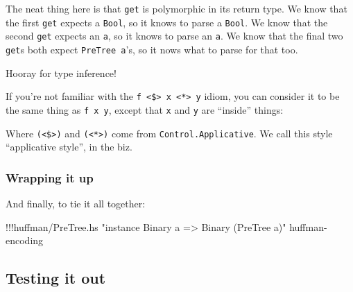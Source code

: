 \documentclass[]{article}
\newenvironment{Shaded}{}{}
\newcommand{\DataTypeTok}[1]{\textcolor[rgb]{0.56,0.13,0.00}{{#1}}}
\newcommand{\DecValTok}[1]{\textcolor[rgb]{0.25,0.63,0.44}{{#1}}}
\newcommand{\StringTok}[1]{\textcolor[rgb]{0.25,0.44,0.63}{{#1}}}
\newcommand{\FunctionTok}[1]{\textcolor[rgb]{0.02,0.16,0.49}{{#1}}}
\newcommand{\NormalTok}[1]{{#1}}
\begin{document}
The neat thing here is that \texttt{get} is polymorphic in its return
type. We know that the first \texttt{get} expects a \texttt{Bool}, so it
knows to parse a \texttt{Bool}. We know that the second \texttt{get}
expects an \texttt{a}, so it knows to parse an \texttt{a}. We know that
the final two \texttt{get}s both expect \texttt{PreTree\ a}'s, so it
nows what to parse for that too.

Hooray for type inference!

If you're not familiar with the
\texttt{f\ \textless{}\$\textgreater{}\ x\ \textless{}*\textgreater{}\ y}
idiom, you can consider it to be the same thing as \texttt{f\ x\ y},
except that \texttt{x} and \texttt{y} are ``inside'' things:

\begin{Shaded}
\end{Shaded}

Where \texttt{(\textless{}\$\textgreater{})} and
\texttt{(\textless{}*\textgreater{})} come from
\texttt{Control.Applicative}. We call this style ``applicative style'',
in the biz.

\subsubsection{Wrapping it up}\label{wrapping-it-up}

And finally, to tie it all together:

\begin{Shaded}
\begin{Highlighting}[]
\FunctionTok{!!!}\NormalTok{huffman}\FunctionTok{/}\NormalTok{PreTree.hs }\StringTok{"instance Binary a => Binary (PreTree a)"} \NormalTok{huffman}\FunctionTok{-}\NormalTok{encoding}
\end{Highlighting}
\end{Shaded}

\subsection{Testing it out}\label{testing-it-out}
\end{document}
